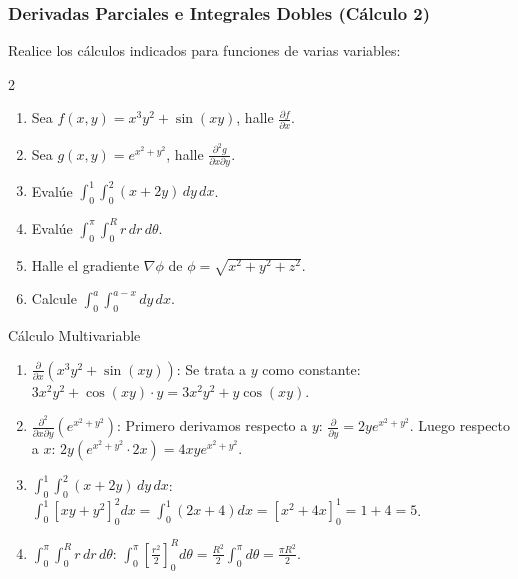 \subsubsection{Derivadas Parciales e Integrales Dobles (Cálculo 2)}
Realice los cálculos indicados para funciones de varias variables:

\begin{multicols}{2}
\begin{enumerate}
    \item Sea $f(x,y) = x^3 y^2 + \sin(xy)$, halle $\frac{\partial f}{\partial x}$.
    \item Sea $g(x,y) = e^{x^2+y^2}$, halle $\frac{\partial^2 g}{\partial x \partial y}$.
    \item Evalúe $\int_0^1 \int_0^2 (x + 2y) \, dy \, dx$.
    \item Evalúe $\int_0^\pi \int_0^R r \, dr \, d\theta$.
    \item Halle el gradiente $\nabla \phi$ de $\phi = \sqrt{x^2 + y^2 + z^2}$.
    \item Calcule $\int_0^a \int_0^{a-x} dy \, dx$.
\end{enumerate}
\end{multicols}
\begin{solucion}{Cálculo Multivariable}
\begin{enumerate}
    \item $\frac{\partial}{\partial x}(x^3 y^2 + \sin(xy))$: Se trata a $y$ como constante:
    $3x^2 y^2 + \cos(xy) \cdot y = 3x^2 y^2 + y\cos(xy)$.
    
    \item $\frac{\partial^2}{\partial x \partial y} (e^{x^2+y^2})$: Primero derivamos respecto a $y$: $\frac{\partial}{\partial y} = 2y e^{x^2+y^2}$. Luego respecto a $x$: $2y (e^{x^2+y^2} \cdot 2x) = 4xy e^{x^2+y^2}$.
    
    \item $\int_0^1 \int_0^2 (x + 2y) \, dy \, dx$: 
    $\int_0^1 [xy + y^2]_0^2 dx = \int_0^1 (2x + 4) dx = [x^2 + 4x]_0^1 = 1 + 4 = 5$.
    
    \item $\int_0^\pi \int_0^R r \, dr \, d\theta$: 
    $\int_0^\pi [\frac{r^2}{2}]_0^R d\theta = \frac{R^2}{2} \int_0^\pi d\theta = \frac{\pi R^2}{2}$.
\end{enumerate}
\end{solucion}
